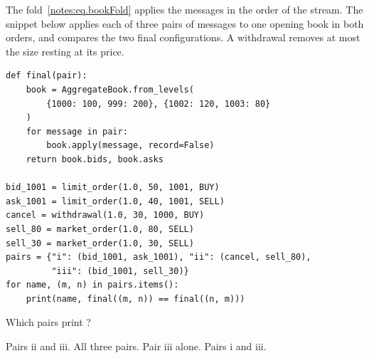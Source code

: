 \begin{question}
\label{question.messagesThatCommuteInTheFold}
The fold~\eqref{notes:eq.bookFold} applies the messages in the order of the stream.
The snippet below applies each of three pairs of messages to one opening book in both orders,
and compares the two final configurations.
A withdrawal removes at most the size resting at its price.
\begin{lstlisting}[caption={Three pairs of messages, each applied in both orders}, label=listing.messagesThatCommuteInTheFoldPairs]
def final(pair):
    book = AggregateBook.from_levels(
        {1000: 100, 999: 200}, {1002: 120, 1003: 80}
    )
    for message in pair:
        book.apply(message, record=False)
    return book.bids, book.asks

bid_1001 = limit_order(1.0, 50, 1001, BUY)
ask_1001 = limit_order(1.0, 40, 1001, SELL)
cancel = withdrawal(1.0, 30, 1000, BUY)
sell_80 = market_order(1.0, 80, SELL)
sell_30 = market_order(1.0, 30, SELL)
pairs = {"i": (bid_1001, ask_1001), "ii": (cancel, sell_80),
         "iii": (bid_1001, sell_30)}
for name, (m, n) in pairs.items():
    print(name, final((m, n)) == final((n, m)))
\end{lstlisting}
Which pairs print ?
\begin{choices}
 \correctchoice Pairs ii and iii.
 \choice All three pairs.
 \choice Pair iii alone.
 \choice Pairs i and iii.
\end{choices}
\end{question}

